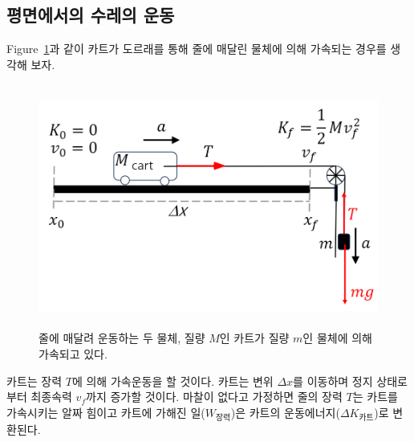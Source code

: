 \documentclass[12pt,a4paper]{article}
\begin{document}
\subsection{평면에서의 수레의 운동}
Figure~\ref{fig3}과 같이 카트가 도르래를 통해 줄에 매달린 물체에 의해 가속되는
경우를 생각해 보자.
\begin{figure}[!h]
    \centering
    \includegraphics[height=8cm]{cart.png}
    \caption{\label{fig3}줄에 매달려 운동하는 두 물체, 질량 $M$인 카트가 질량
        $m$인 물체에 의해 가속되고 있다.}
\end{figure}
카트는 장력 $T$에 의해 가속운동을 할 것이다. 카트는 변위 $\Delta x$를 이동하며 정지
상태로부터 최종속력 $v_f$까지 증가할 것이다. 마찰이 없다고 가정하면 줄의 장력 $T$는
카트를 가속시키는 알짜 힘이고 카트에 가해진 일($W_{\textrm{장력}}$)은 카트의
운동에너지($\Delta K_{\textrm{카트}}$)로 변환된다.
\end{document}
